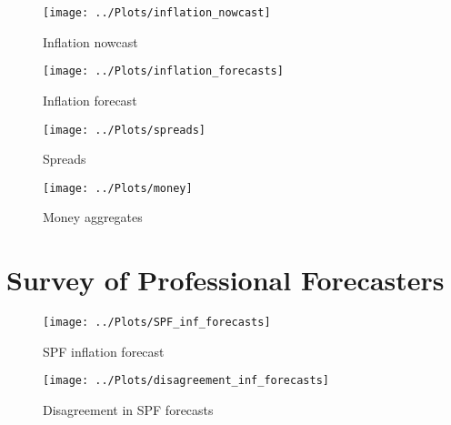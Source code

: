 \documentclass{beamer}
\begin{document}
\begin{frame}
\begin{figure}
	\centering
	\texttt{[image: ../Plots/inflation\_nowcast]}
	\caption{Inflation nowcast}
\end{figure}
\end{frame}

\begin{frame}
\begin{figure}
	\centering
	\texttt{[image: ../Plots/inflation\_forecasts]}
	\caption{Inflation forecast}
\end{figure}
\end{frame}

\begin{frame}
\begin{figure}
	\centering
	\texttt{[image: ../Plots/spreads]}
	\caption{Spreads}
\end{figure}
\end{frame}


\begin{frame}
\begin{figure}
	\centering
	\texttt{[image: ../Plots/money]}
	\caption{Money aggregates}
\end{figure}
\end{frame}

\section{Survey of Professional Forecasters}
\begin{frame}
\begin{figure}
	\centering
	\texttt{[image: ../Plots/SPF\_inf\_forecasts]}
	\caption{SPF inflation forecast}
\end{figure}
\end{frame}


\begin{frame}
\begin{figure}
	\centering
	\texttt{[image: ../Plots/disagreement\_inf\_forecasts]}
	\caption{Disagreement in SPF forecasts}
\end{figure}
\end{frame}
\end{document}
